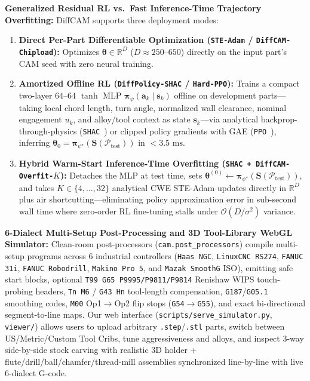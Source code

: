 \documentclass[conference]{IEEEtran}
\begin{document}
\textbf{Generalized Residual RL vs.\ Fast Inference-Time Trajectory Overfitting:}
DiffCAM supports three deployment modes:
\begin{enumerate}
  \item \textbf{Direct Per-Part Differentiable Optimization (\texttt{STE-Adam} / \texttt{DiffCAM-Chipload}):} Optimizes $\boldsymbol{\theta} \in \mathbb{R}^D$ ($D \approx 250\text{--}650$) directly on the input part's CAM seed with zero neural training.
  \item \textbf{Amortized Offline RL (\texttt{DiffPolicy-SHAC} / \texttt{Hard-PPO}):} Trains a compact two-layer $64$--$64$ $\tanh$ MLP $\boldsymbol{\pi}_\psi(\mathbf{a}_k \mid \mathbf{s}_k)$ offline on development parts—taking local chord length, turn angle, normalized wall clearance, nominal engagement $u_k$, and alloy/tool context as state $\mathbf{s}_k$—via analytical backprop-through-physics (\texttt{SHAC}~\cite{xu2022accelerated}) or clipped policy gradients with GAE (\texttt{PPO}~\cite{schulman2017proximal,schulman2016gae}), inferring $\boldsymbol{\theta}_0 = \boldsymbol{\pi}_{\psi^\star}(\mathbf{S}(\mathcal{P}_{\text{test}}))$ in $<\!3.5\text{ ms}$.
  \item \textbf{Hybrid Warm-Start Inference-Time Overfitting (\texttt{SHAC + DiffCAM-Overfit-$K$}):} Detaches the MLP at test time, sets $\boldsymbol{\theta}^{(0)} \leftarrow \boldsymbol{\pi}_{\psi^\star}(\mathbf{S}(\mathcal{P}_{\text{test}}))$, and takes $K \in \{4,\dots,32\}$ analytical CWE STE-Adam updates directly in $\mathbb{R}^D$ plus air shortcutting—eliminating policy approximation error in sub-second wall time where zero-order RL fine-tuning stalls under $\mathcal{O}(D/\sigma^2)$ variance.
\end{enumerate}

\textbf{6-Dialect Multi-Setup Post-Processing and 3D Tool-Library WebGL Simulator:}
Clean-room post-processors (\texttt{cam.post\_processors}) compile multi-setup programs across 6 industrial controllers (\texttt{Haas NGC}, \texttt{LinuxCNC RS274}, \texttt{FANUC 31i}, \texttt{FANUC Robodrill}, \texttt{Makino Pro 5}, and \texttt{Mazak SmoothG} ISO), emitting safe start blocks, optional \texttt{T99 G65 P9995/P9811/P9814} Renishaw WIPS touch-probing headers, \texttt{Tn M6} / \texttt{G43 Hn} tool-length compensation, \texttt{G187}/\texttt{G05.1} smoothing codes, \texttt{M00} Op1$\to$Op2 flip stops (\texttt{G54}$\to$\texttt{G55}), and exact bi-directional segment-to-line maps. Our web interface (\texttt{scripts/serve\_simulator.py}, \texttt{viewer/}) allows users to upload arbitrary \texttt{.step}/\texttt{.stl} parts, switch between US/Metric/Custom Tool Cribs, tune aggressiveness and alloys, and inspect 3-way side-by-side stock carving with realistic 3D holder + flute/drill/ball/chamfer/thread-mill assemblies synchronized line-by-line with live 6-dialect G-code.
\end{document}
